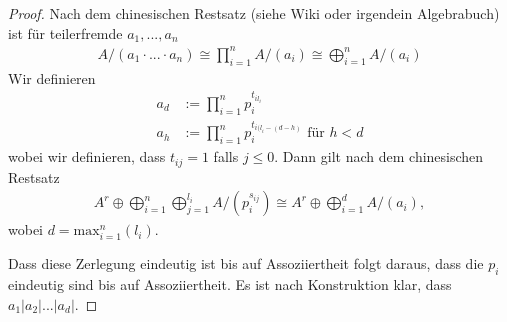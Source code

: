 \documentclass{article}
\theoremstyle{definition}
\theoremstyle{plain}
\theoremstyle{remark}
\begin{document}
\begin{proof}
	Nach dem chinesischen Restsatz (siehe Wiki oder irgendein Algebrabuch) ist für teilerfremde $a_1,...,a_n$
	\begin{align}
		A/(a_1\cdot ...\cdot a_n)\cong \prod_{i=1}^nA/(a_i)\cong \bigoplus_{i=1}^nA/(a_i)
	\end{align}
	Wir definieren 
	\begin{align}
		a_d&:=\prod_{i=1}^n p_i^{t_{il_i}} \\
		a_h&:= \prod_{i=1}^n p_i^{t_{i(l_i-(d-h)}} \text{ für } h<d
	\end{align}
	wobei wir definieren, dass $t_{ij}=1$ falls $j\leq 0$.
	Dann gilt nach dem chinesischen Restsatz
	\begin{align}
		A^{r}\oplus\bigoplus_{i=1}^{n}\bigoplus_{j=1}^{l_i}A/(p_i^{s_{ij}})\cong A^{r}\oplus\bigoplus_{i=1}^dA/(a_i),
	\end{align}
	wobei $d=\mathrm{max}_{i=1}^n(l_i)$.

	Dass diese Zerlegung eindeutig ist bis auf Assoziiertheit folgt daraus, dass die $p_i$ eindeutig sind bis auf Assoziiertheit. Es ist nach Konstruktion klar, dass $a_1|a_2|...|a_d|$.
\end{proof}
\end{document}
